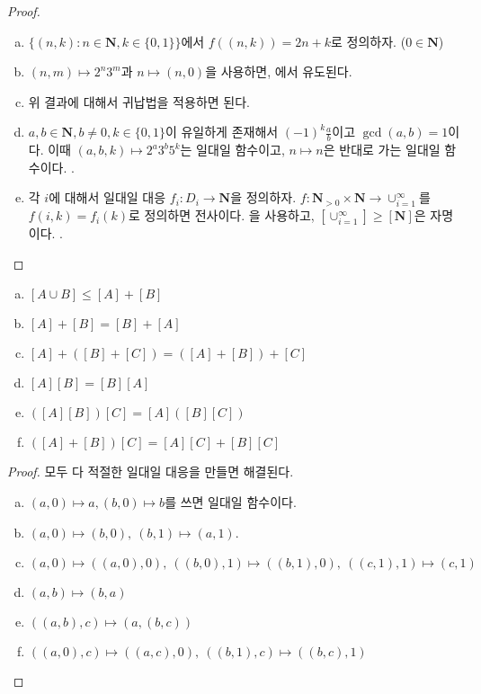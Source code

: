 \begin{proof}
	\begin{enumerate}[(a)]
		\item $\{(n, k) : n \in \mathbf{N}, k \in \{0, 1\} \}$에서 $f((n, k)) = 2n + k$로 정의하자. ($0 \in \mathbf{N}$)
		\item $(n, m) \mapsto 2^n3^m$과 $n \mapsto (n, 0)$을 사용하면, 에서 유도된다.
		\item 위 결과에 대해서 귀납법을 적용하면 된다.
		\item $a, b \in \mathbf{N}, b \neq 0, k \in \{0, 1\}$이 유일하게 존재해서 ${(-1)}^k\frac{a}{b}$이고 $\gcd(a, b) = 1$이다.
		이때 $(a, b, k) \mapsto 2^a3^b5^k$는 일대일 함수이고, $n \mapsto n$은 반대로 가는 일대일 함수이다. .
		\item 각 $i$에 대해서 일대일 대응 $f_i : D_i \to \mathbf{N}$을 정의하자.
		$f : \mathbf{N}_{>0} \times \mathbf{N} \to \cup_{i = 1}^{\infty}$를 $f(i, k) = f_i(k)$로 정의하면 전사이다.
		을 사용하고, $[\cup_{i = 1}^{\infty}] \geq [\mathbf{N}]$은 자명이다. .
	\end{enumerate}
\end{proof}
\begin{theorem}
	\begin{enumerate}[(a)]
		\item $[A \cup B] \leq [A] + [B]$
		\item $[A] + [B] = [B] + [A]$
		\item $[A] + ([B] + [C]) = ([A] + [B]) + [C]$
		\item $[A][B] = [B][A]$
		\item $([A][B])[C] = [A]([B][C])$
		\item $([A] + [B])[C] = [A][C] + [B][C]$
	\end{enumerate}
\end{theorem}
\begin{proof}
	모두 다 적절한 일대일 대응을 만들면 해결된다.
	\begin{enumerate}[(a)]
		\item $(a, 0) \mapsto a, (b, 0) \mapsto b$를 쓰면 일대일 함수이다.
		\item $(a, 0) \mapsto (b, 0),\: (b, 1) \mapsto (a, 1)$.
		\item $(a, 0) \mapsto ((a, 0), 0),\: ((b, 0), 1) \mapsto ((b, 1), 0),\: ((c, 1), 1) \mapsto (c, 1)$
		\item $(a, b) \mapsto (b, a)$
		\item $((a, b), c) \mapsto (a, (b, c))$
		\item $((a, 0), c) \mapsto ((a, c), 0),\: ((b, 1), c) \mapsto ((b, c), 1)$
	\end{enumerate}
\end{proof}
